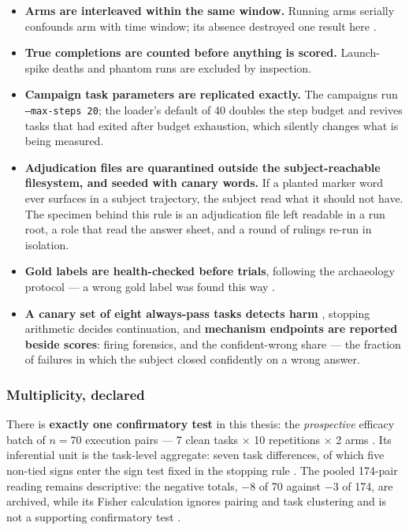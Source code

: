 \begin{itemize}
  \item \textbf{Arms are interleaved within the same window.} Running arms
        serially confounds arm with time window; its absence destroyed one
        result here .
  \item \textbf{True completions are counted before anything is scored.}
        Launch-spike deaths and phantom runs are excluded by inspection.
  \item \textbf{Campaign task parameters are replicated exactly.} The
        campaigns run \texttt{--max-steps 20}; the loader's default of 40
        doubles the step budget and revives tasks that had exited after budget exhaustion,
        which silently changes what is being measured.
  \item \textbf{Adjudication files are quarantined outside the
        subject-reachable filesystem, and seeded with canary words.} If a
        planted marker word ever surfaces in a subject trajectory, the
        subject read what it should not have. The specimen behind this
        rule is an adjudication file left readable in a run root, a role
        that read the answer sheet, and a round of rulings re-run in
        isolation.
  \item \textbf{Gold labels are health-checked before trials}, following
        the archaeology protocol --- a wrong gold label was found this way
        .
  \item \textbf{A canary set of eight always-pass tasks detects harm}
        , stopping arithmetic decides continuation, and
        \textbf{mechanism endpoints are reported beside scores}: firing
        forensics, and the confident-wrong share --- the fraction of
        failures in which the subject closed confidently on a wrong
        answer.
\end{itemize}

\subsubsection*{Multiplicity, declared}

There is \textbf{exactly one confirmatory test} in this thesis: the
\emph{prospective} efficacy batch of $n{=}70$ execution pairs --- 7 clean
tasks $\times$ 10 repetitions $\times$ 2 arms . Its inferential unit is the
task-level aggregate: seven task differences, of which five non-tied signs
enter the sign test fixed in the stopping rule . The pooled 174-pair
reading remains descriptive: the negative totals, $-8$ of 70 against $-3$
of 174, are archived, while its Fisher calculation ignores pairing and task
clustering and is not a supporting confirmatory test .

